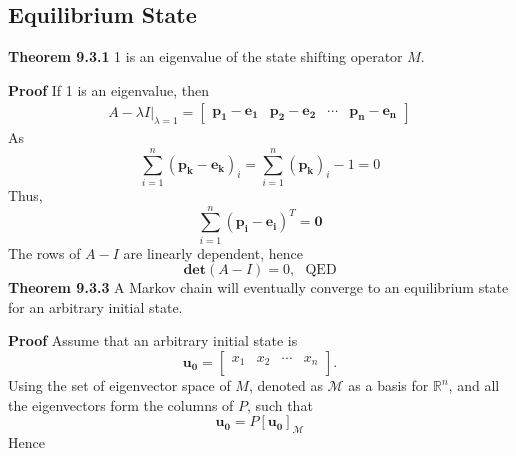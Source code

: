\documentclass[11pt]{article}
\begin{document}
\subsection{Equilibrium State}
\noindent \textbf{Theorem 9.3.1} 1 is an eigenvalue of the state shifting operator $M$. \par 
\noindent \textbf{Proof} If 1 is an eigenvalue, then
\begin{equation}
\begin{aligned}
    A-\lambda I \bigg|_{\lambda=1} = \begin{bmatrix}
    \bm{p_1 - e_1} & \bm{p_2 - e_2} & \cdots & \bm{p_n-e_n}
    \end{bmatrix}
\end{aligned}
\end{equation}
As
\begin{equation}
    \sum_{i=1}^{n}(\bm{p_k - e_k})_i = \sum_{i=1}^{n}(\bm{p_k})_i - 1 = 0
\end{equation}
Thus,
\begin{equation}
    \sum_{i=1}^{n} (\bm{p_i-e_i})^{T} = \bm{0}
\end{equation}
The rows of $A-I$ are linearly dependent, hence
\begin{equation}
    \bm{det}(A-I) = 0,~~~\text{QED}
\end{equation}
\noindent \textbf{Theorem 9.3.3} A Markov chain will eventually converge to an equilibrium state for an arbitrary initial state. \par \noindent 
\textbf{Proof} Assume that an arbitrary initial state is
\begin{equation}
    \bm{u_0} = \begin{bmatrix}
    x_1 & x_2 & \cdots & x_n \\
    \end{bmatrix}.
\end{equation}
Using the set of eigenvector space of $M$, denoted as $\mathcal{M}$ as a basis for $\mathbb{R}^n$, and all the eigenvectors form the columns of $P$, such that
\begin{equation}
    \bm{u_0} = P[\bm{u_0}]_{\mathcal{M}}
\end{equation}
Hence
\end{document}
